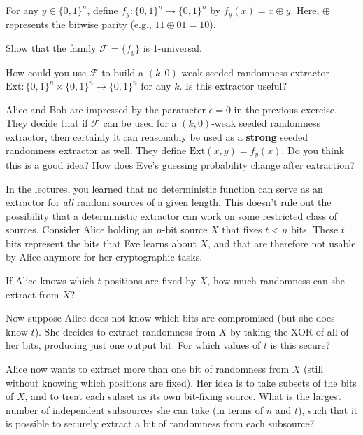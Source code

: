 \documentclass[a4paper,10pt,landscape,twocolumn]{scrartcl}
\begin{document}
\begin{exercise}
	For any $y \in \{0,1\}^n$, define $f_y : \{0,1\}^n \to \{0,1\}^n$ by $f_y(x) = x \oplus y$. Here, $\oplus$ represents the bitwise parity (e.g., $11 \oplus 01 = 10$).
	\begin{subex}
		Show that the family $\mathscr{F} = \{f_y\}$ is 1-universal.
	\end{subex}
    \begin{subex}
    	How could you use $\mathscr{F}$ to build a $(k,0)$-weak seeded randomness extractor $\text{Ext} : \{0,1\}^n \times \{0,1\}^n \to \{0,1\}^n$ for any $k$. Is this extractor useful?
    \end{subex}
    \begin{subex}
    	Alice and Bob are impressed by the parameter $\epsilon = 0$ in the previous exercise. They decide that if $\mathscr{F}$ can be used for a $(k,0)$-weak seeded randomness extractor, then certainly it can reasonably be used as a \textbf{strong} seeded randomness extractor as well. They define $\text{Ext}(x,y) = f_y(x)$. Do you think this is a good idea? How does Eve's guessing probability change after extraction?
    \end{subex}
\end{exercise}

\begin{exercise}
	In the lectures, you learned that no deterministic function can serve as an extractor for \emph{all} random sources of a given length. This doesn't rule out the possibility that a deterministic extractor can work on some restricted class of sources. Consider Alice holding an $n$-bit source $X$ that fixes $t < n$ bits. These $t$ bits represent the bits that Eve learns about $X$, and that are therefore not usable by Alice anymore for her cryptographic tasks.
	\begin{subex}
		If Alice knows which $t$ positions are fixed by $X$, how much randomness can she extract from $X$?
	\end{subex}
	\begin{subex}
		Now suppose Alice does not know which bits are compromised (but she does know $t$). She decides to extract randomness from $X$ by taking the XOR of all of her bits, producing just one output bit. For which values of $t$ is this secure?
	\end{subex}
    \begin{subex}
   	    Alice now wants to extract more than one bit of randomness from $X$ (still without knowing which positions are fixed). Her idea is to take subsets of the bits of $X$, and to treat each subset as its own bit-fixing source. What is the largest number of independent subsources she can take (in terms of $n$ and $t$), such that it is possible to securely extract a bit of randomness from each subsource?
   	\end{subex}
\end{exercise}
\end{document}
